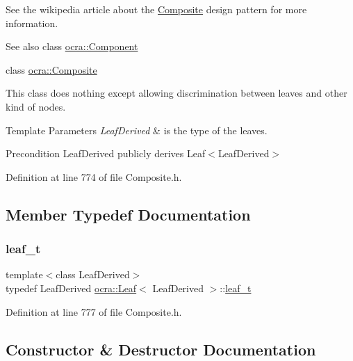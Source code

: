See the wikipedia article about the \hyperlink{classocra_1_1Composite}{Composite} design pattern for more information. \begin{DoxySeeAlso}{See also}
class \hyperlink{classocra_1_1Component}{ocra\+::\+Component} 

class \hyperlink{classocra_1_1Composite}{ocra\+::\+Composite}
\end{DoxySeeAlso}
This class does nothing except allowing discrimination between leaves and other kind of nodes.


\begin{DoxyTemplParams}{Template Parameters}
{\em Leaf\+Derived} & is the type of the leaves.\\
\hline
\end{DoxyTemplParams}
\begin{DoxyPrecond}{Precondition}
Leaf\+Derived publicly derives Leaf$<$\+Leaf\+Derived$>$ 
\end{DoxyPrecond}


Definition at line 774 of file Composite.\+h.



\subsection{Member Typedef Documentation}
\hypertarget{classocra_1_1Leaf_ab2cc1a54ddf2da28942fa60c8da165f1}{}\label{classocra_1_1Leaf_ab2cc1a54ddf2da28942fa60c8da165f1} 
\subsubsection{\texorpdfstring{leaf\+\_\+t}{leaf\_t}}
{\footnotesize\ttfamily template$<$class Leaf\+Derived$>$ \\
typedef Leaf\+Derived \hyperlink{classocra_1_1Leaf}{ocra\+::\+Leaf}$<$ Leaf\+Derived $>$\+::\hyperlink{classocra_1_1Leaf_ab2cc1a54ddf2da28942fa60c8da165f1}{leaf\+\_\+t}}



Definition at line 777 of file Composite.\+h.



\subsection{Constructor \& Destructor Documentation}
\hypertarget{classocra_1_1Leaf_a8c1c832842c03c2a0c24c2129ddbdc8a}{}\label{classocra_1_1Leaf_a8c1c832842c03c2a0c24c2129ddbdc8a} 
